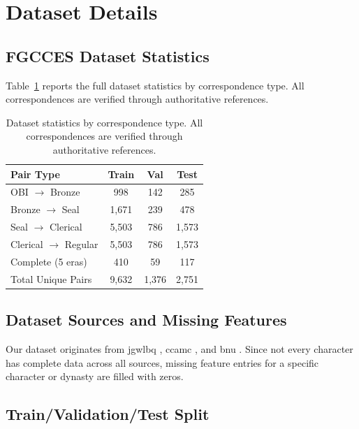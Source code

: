 \documentclass{article}
\begin{document}
\section{Dataset Details}
\label{app:dataset_details}

\subsection{FGCCES Dataset Statistics}
\label{app:fgcces_statistics}

Table~\ref{tab:dataset_stats_appendix} reports the full dataset statistics by correspondence type. 
All correspondences are verified through authoritative references.

\begin{table}[h]
\centering
\caption{Dataset statistics by correspondence type. All correspondences are verified through authoritative references.}
\label{tab:dataset_stats_appendix}
\begin{tabular}{lccc}
\toprule
\textbf{Pair Type} & \textbf{Train} & \textbf{Val} & \textbf{Test} \\
\midrule
OBI $\to$ Bronze & 998 & 142 & 285 \\
Bronze $\to$ Seal & 1,671 & 239 & 478 \\
Seal $\to$ Clerical & 5,503 & 786 & 1,573 \\
Clerical $\to$ Regular & 5,503 & 786 & 1,573 \\
Complete (5 eras) & 410 & 59 & 117 \\
\midrule
Total Unique Pairs & 9,632 & 1,376 & 2,751 \\
\bottomrule
\end{tabular}
\end{table}

\subsection{Dataset Sources and Missing Features}
\label{app:dataset_sources}

Our dataset originates from jgwlbq \cite{lbqjqw}, ccamc \cite{ccamc}, and bnu \cite{bnu}. 
Since not every character has complete data across all sources, missing feature entries for a specific character or dynasty are filled with zeros.

\subsection{Train/Validation/Test Split}
\label{app:data_split}
\end{document}
